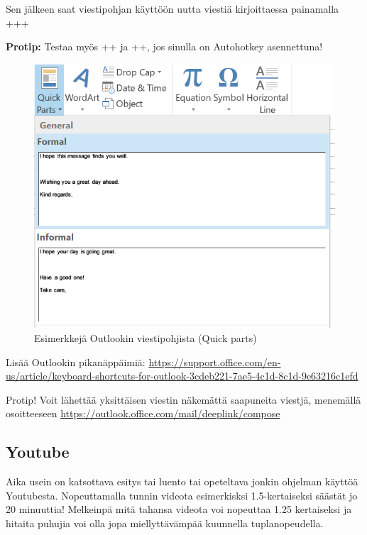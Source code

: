 \documentclass[a4paper,12pt]{scrartcl}
\begin{document}



Sen jälkeen saat viestipohjan käyttöön uutta viestiä kirjoittaessa painamalla \\ +++\keys{\return}

\textbf{Protip:} Testaa myös \keys{\ctrl}++ ja \keys{\ctrl}++, jos sinulla on Autohotkey asennettuna!

\begin{figure}[H]
	\includegraphics[width=\linewidth]{img/Quick_parts.png}
	\caption{Esimerkkejä Outlookin viestipohjista (Quick parts)}
	\label{fig:Quick_parts}
\end{figure}

\medskip

Lisää Outlookin pikanäppäimiä: \url{https://support.office.com/en-us/article/keyboard-shortcuts-for-outlook-3cdeb221-7ae5-4c1d-8c1d-9e63216c1efd}

Protip! Voit lähettää yksittäisen viestin näkemättä saapuneita viestjä, menemällä osoitteeseen \url{https://outlook.office.com/mail/deeplink/compose}

\subsection{Youtube}

Aika usein on katsottava esitys tai luento tai opeteltava jonkin ohjelman käyttöä Youtubesta. Nopeuttamalla tunnin videota esimerkisksi 1.5-kertaiseksi säästät jo 20 minuuttia! Melkeinpä mitä tahansa videota voi nopeuttaa 1.25 kertaiseksi ja hitaita puhujia voi olla jopa miellyttävämpää kuunnella tuplanopeudella.
\end{document}
